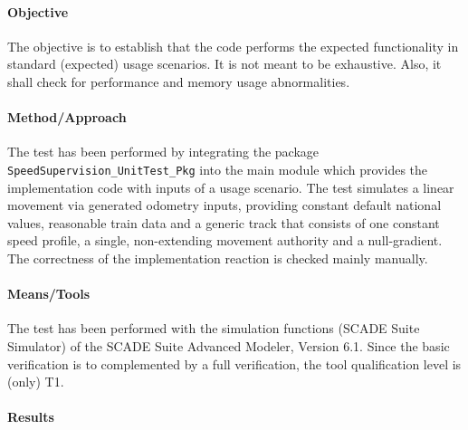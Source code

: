 \paragraph{Objective}

The objective is to establish that the code performs the expected
functionality in standard (expected) usage scenarios. It is not
meant to be exhaustive. Also, it shall check for performance and
memory usage abnormalities. 

\paragraph{Method/Approach}

The test has been performed by integrating the package
\texttt{SpeedSupervision\_UnitTest\_Pkg} into the main module which
provides the implementation code with inputs of a usage scenario. The
test simulates a linear movement via generated odometry inputs,
providing constant default national values, reasonable train data and
a generic track that consists of one constant speed profile, a single,
non-extending movement authority and a null-gradient. The correctness
of the implementation reaction is checked mainly manually. 

\paragraph{Means/Tools}

The test has been performed with the simulation functions (SCADE Suite
Simulator) of the SCADE Suite Advanced Modeler, Version 6.1. Since the
basic verification is to complemented by a full verification, the tool
qualification level is (only) T1.  

\paragraph{Results}

